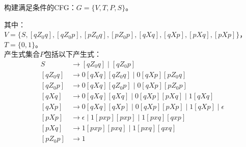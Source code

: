 \begin{solution}
构建满足条件的CFG：$G=\{V,T,P,S\}$。

其中：$V=\{S,[qZ_0q],[qZ_0p],[pZ_0q],[pZ_0p],[qXq],[qXp],[pXq],[pXp]\}$，
$T=\{0,1\}$。\\
产生式集合$P$包括以下产生式：
\begin{align*}
    S       &\rightarrow [qZ_0q] \mid [qZ_0p]\\
    [qZ_0q] &\rightarrow 0[qXq][qZ_0q] \mid 0[qXp][pZ_0q]\\
    [qZ_0p] &\rightarrow 0[qXq][qZ_0p] \mid 0[qXp][pZ_0p]\\
    [qXq]   &\rightarrow 0[qXq][qXq] \mid 0[qXp][pXq] \mid 1[qXq]\\
    [qXp]   &\rightarrow 0[qXq][qXp] \mid 0[qXp][pXp] \mid 1[qXp] \mid \epsilon\\
    [pXp]   &\rightarrow \epsilon \mid 1[pxp][pxp] \mid 1[pxq][qxp]\\
    [pXq]   &\rightarrow 1[pxp][pxq] \mid 1[pxq][qxq]\\
    [pZ_0p] &\rightarrow 1\\
\end{align*}
\end{solution}